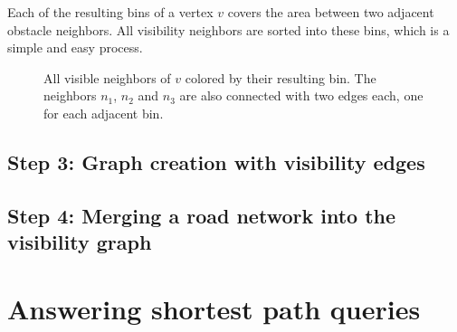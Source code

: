 				Each of the resulting bins of a vertex $v$ covers the area between two adjacent obstacle neighbors.
				All visibility neighbors are sorted into these bins, which is a simple and easy process.
				
				\begin{figure}[h]
					\begin{center}
					\end{center}
					\caption{All visible neighbors of $v$ colored by their resulting bin. The neighbors $n_1$, $n_2$ and $n_3$ are also connected with two edges each, one for each adjacent bin.}
				\end{figure}
			
	\subsection{Step 3: Graph creation with visibility edges}
	\label{subsec:step-3-graph-creation}
		
	\subsection{Step 4: Merging a road network into the visibility graph}

\section{Answering shortest path queries}
\label{sec:answering-queries}